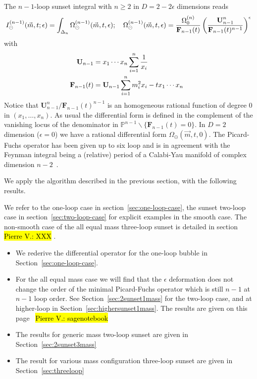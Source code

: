 \documentclass[a4paper,12pt]{article}
\numberwithin{equation}{section}
\numberwithin{figure}{section}
\def\su{\circleddash}
\newcommand{\pvnote}[1]{\sethlcolor{bubblegum} \protect\hl{Pierre V.: #1} \sethlcolor{yellow}}
\begin{document}
The $n-1$-loop sunset integral with $n\geq2$ in $D=2-2\epsilon$ dimensions reads
\begin{equation}
  I^{(n-1)}_\su(\vec m,t;\epsilon)= \int_{\Delta_n} \Omega^{(n-1)}_\su(\vec m,t,\epsilon)  ; \quad
  \Omega^{(n-1)}_\su(\vec m, t,\epsilon)={\Omega^{(n)}_0\over
    \textbf{F}_{n-1}(t)}\left(\textbf{U}_{n-1}^n\over \textbf{F}_{n-1}(t)^{n-1}\right)^\epsilon
\end{equation}
with
\begin{align}
  \textbf{ U}_{n-1}&= x_1\cdots x_n\sum_{i=1}^n {1\over x_i} \cr
      \textbf{   F}_{n-1}(t)&= \textbf{U}_{n-1} \sum_{i=1}^n m_i^2x_i-t x_1\cdots x_n
\end{align}
Notice that $\textbf{U}_{n-1}^n/ \textbf{F}_{n-1}(t)^{n-1}$ is an homogeneous
rational function  of degree
0 in $(x_1,\dots,x_n)$. As usual the differential form is defined in
the complement of the vanishing locus of the denominator in $\mathbb P^{n-1}\backslash\{\textbf{F}_{n-1}(t)=0\}$.
In $D=2$ dimension ($\epsilon=0$) we have a rational  differential form
$\Omega_\su(\vec m,t,0)$. The Picard-Fuchs operator has been
given up to six loop and is in agreement with the Feynman integral
being a (relative) period of a Calabi-Yau  manifold of complex dimension $n-2$~\cite{Bloch:2013tra,Bloch:2014qca,Bloch:2014qca,Bourjaily:2019hmc,Bonisch:2020qmm,Bonisch:2021yfw,Candelas:2021lkc,Forum:2022lpz}.

We apply the algorithm described in the previous section, with the
following results.
{\bf 


 We refer to the one-loop case in
   section~\ref{sec:one-loop-case}, the sunset two-loop case in
   section~\ref{sec:two-loop-case} for explicit examples in the smooth
   case. The non-smooth case of the all equal mass three-loop sunset
   is detailed in section~\pvnote{XXX}.
}
\begin{itemize}
  \item We rederive the differential operator for the one-loop bubble
    in Section~\ref{sec:one-loop-case}.
\item For the all equal mass case we will find that the $\epsilon$
deformation does not change the order of the minimal Picard-Fuchs
operator which is still $n-1$ at $n-1$ loop order. See
Section~\ref{sec:2sunset1mass} for the two-loop case, and at
higher-loop in Section~\ref{sec:highersunset1mass}. The results are
given on this page~\pvnote{sagenotebook}
\item The results for  generic mass two-loop sunset are given in
  Section~\ref{sec:2sunset3mass}
  \item The result for various mass configuration three-loop sunset
    are given in Section~\ref{sec:threeloop}
\end{itemize}
\end{document}
